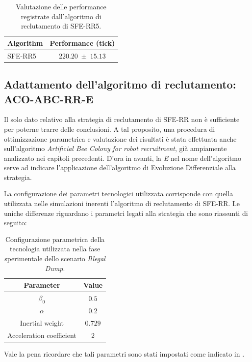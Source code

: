 \begin{table}[H]
    \centering
    \captionsetup{justification=centering, margin=2cm, font=footnotesize}
    \begin{tabular}{|l|c|}
    \hline
    \textbf{Algorithm}              & \textbf{Performance (tick)}              \\ \hline
    SFE-RR5        & $220.20 \; \pm \; 15.13$           \\ \hline
    \end{tabular}%
    
    \caption{Valutazione delle performance registrate dall'algoritmo di reclutamento di SFE-RR5.}
    \label{tabella_performance_dump}
\end{table}

\subsection{Adattamento dell'algoritmo di reclutamento: \\ACO-ABC-RR-E}

Il solo dato relativo alla strategia di reclutamento di SFE-RR non è sufficiente per poterne trarre delle conclusioni.
A tal proposito, una procedura di ottimizzazione parametrica e valutazione dei risultati è stata effettuata anche sull'algoritmo \textit{Artificial Bee Colony for robot recruitment}, già ampiamente analizzato nei capitoli precedenti.
D'ora in avanti, la \textit{E} nel nome dell'algoritmo serve ad indicare l'applicazione dell'algoritmo di Evoluzione Differenziale alla strategia.

La configurazione dei parametri tecnologici utilizzata corrisponde con quella utilizzata nelle simulazioni inerenti l'algoritmo di reclutamento di SFE-RR.
Le uniche differenze riguardano i parametri legati alla strategia che sono riassunti di seguito:

\begin{table}[H]
    \centering
    \captionsetup{justification=centering, margin=2cm, font=footnotesize}
    \begin{tabular}{|c|c|}
    \hline
    \textbf{Parameter}                      & \textbf{Value}        \\ \hline
    $\beta_{0}$                             & $0.5$                 \\ \hline
    $\alpha$                                & $0.2$                 \\ \hline
    Inertial weight                         & $0.729$               \\ \hline
    Acceleration coefficient                & $2$                   \\ \hline
    \end{tabular}%
    
    \caption{Configurazione parametrica della tecnologia utilizzata nella fase sperimentale dello scenario \textit{Illegal Dump}.}
    \label{tabella_parametri_dump_ABC}
\end{table}
Vale la pena ricordare che tali parametri sono stati impostati come indicato in \cite{palmieri2017comparison}.

